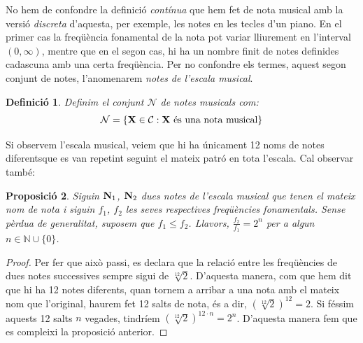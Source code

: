 \documentclass{article}
\theoremstyle{math}
\newtheorem{definition}{Definició}[section]
\newtheorem{prop}[definition]{Proposició}
\theoremstyle{TheoremNum}
\newcommand{\0}{\ensuremath{\vb{0}}}
\newcommand{\N}{\ensuremath{\vb{N}}}
\newcommand{\X}{\ensuremath{\vb{X}}}
\begin{document}
\noindent No hem de confondre la definició \textit{contínua} que hem fet de nota musical amb la versió \textit{discreta} d'aquesta, per exemple, les notes en les tecles d'un piano. En el primer cas la freqüència fonamental de la nota pot variar lliurement en l'interval $(0,\infty)$, mentre que en el segon cas, hi ha un nombre finit de notes definides cadascuna amb una certa freqüència. Per no confondre els termes, aquest segon conjunt de notes, l'anomenarem \textit{notes de l'escala musical}.
\begin{definition}
    Definim el conjunt $\mathcal{N}$ de notes musicals com: $$\mathcal{N}=\left\{\X\in\mathcal{C}:\X\text{ és una nota musical}\right\}$$
\end{definition}
\noindent Si observem l'escala musical, veiem que hi ha únicament 12 noms de notes diferents\footnotemark\space que es van repetint seguint el mateix patró en tota l'escala. Cal observar també:
\begin{prop}
  Siguin $\N_1$, $\N_2$ dues notes de l'escala musical que tenen el mateix nom de nota i siguin $f_1$, $f_2$ les seves respectives freqüències fonamentals. Sense pèrdua de generalitat, suposem que $f_1 \leq f_2$. Llavors, $\frac{f_{2}}{f_{1}} = 2^n$ per a algun $n \in \mathbb{N}\cup\{0\}$.
\end{prop}
\begin{proof}
    Per fer que això passi, es declara que la relació entre les freqüències de dues notes successives sempre sigui de $\sqrt[12]{2}$\footnotemark. D'aquesta manera, com que hem dit que hi ha 12 notes diferents, quan tornem a arribar a una nota amb el mateix nom que l'original, haurem fet 12 salts de nota, és a dir, $\left(\sqrt[12]{2}\right)^{12} = 2$. Si féssim aquests 12 salts $n$ vegades, tindríem ${\left(\sqrt[12]{2}\right)}^{12\cdot n} = 2^n$. D'aquesta manera fem que es compleixi la proposició anterior. 
\end{proof}
\end{document}
